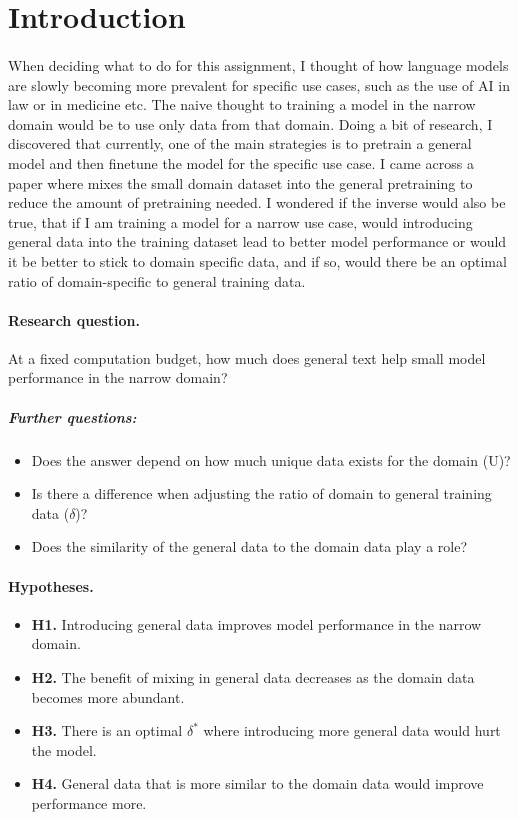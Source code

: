 \documentclass[10pt,a4paper]{article}
\begin{document}
\section{Introduction}
\paragraph{}When deciding what to do for this assignment, I thought of how language models are slowly becoming more prevalent for specific use cases, such as the use of AI in law or in medicine etc. The naive thought to training a model in the narrow domain would be to use only data from that domain. Doing a bit of research, I discovered that currently, one of the main strategies is to pretrain a general model and then finetune the model for the specific use case. I came across a paper where \citep{spt2026} mixes the small domain dataset into the general pretraining to reduce the amount of pretraining needed. I wondered if the inverse would also be true, that if I am training a model for a narrow use case, would introducing general data into the training dataset lead to better model performance or would it be better to stick to domain specific data, and if so, would there be an optimal ratio of domain-specific to general training data.


\paragraph{Research question.} At a fixed computation budget, how much does general text help small model performance in the narrow domain? 
\subparagraph{Further questions:}
\begin{itemize}
    \item Does the answer depend on how much unique data exists for the domain (U)?
    \item Is there a difference when adjusting the ratio of domain to general training data ($\delta$)? 
    \item Does the similarity of the general data to the domain data play a role?
\end{itemize}



\paragraph{Hypotheses.}
\begin{itemize}
\item \textbf{H1.} Introducing general data improves model performance in the narrow domain.
\item \textbf{H2.} The benefit of mixing in general data decreases as the domain data becomes more abundant.
\item \textbf{H3.} There is an optimal $\delta^*$ where introducing more general data would hurt the model.
\item \textbf{H4.} General data that is more similar to the domain data would improve performance more.
\end{itemize}
\end{document}
